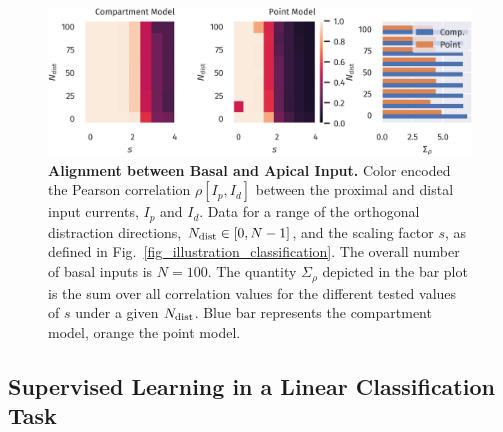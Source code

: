 \documentclass[utf8]{frontiersSCNS} %
\begin{document}
\begin{figure}[t]
\centering
\includegraphics[width=1.0\columnwidth]{corr_dimension_scaling_high_input_dim}
\caption{{\bf Alignment between Basal and Apical Input.} Color
encoded the Pearson correlation $\rho[I_p,I_d]$ 
between the proximal and distal input currents,
$I_p$ and $I_d$. Data for a range of the orthogonal 
distraction directions, $N_{\rm dist}\in[0,N-1]$, 
and the scaling factor $s$, as defined in
Fig.~\ref{fig_illustration_classification}.
The overall number of basal inputs is $N=100$.
The quantity $\Sigma_{\rho}$ depicted in the bar
plot is the sum over all correlation values for the different tested values
of $s$ under a given $N_{\rm dist}$. Blue bar represents the compartment model,
orange the point model.}
\label{fig_corr_dimension_scaling}
\end{figure}

\subsection{Supervised Learning in a Linear Classification Task}
\label{sect:classification}
\end{document}
